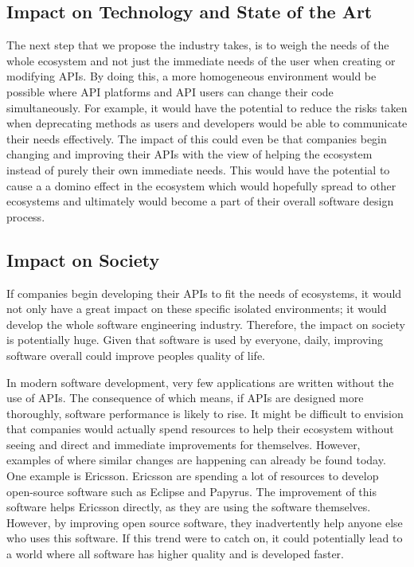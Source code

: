 \documentclass{article}
\begin{document}
\subsection{Impact on Technology and State of the Art}
The next step that we propose the industry takes, is to weigh the needs of the whole ecosystem and not just the immediate needs of the user when creating or modifying APIs. By doing this, a more homogeneous environment would be possible where API platforms and API users can change their code simultaneously. For example, it would have the potential to reduce the risks taken when deprecating methods as users and developers would be able to communicate their needs effectively. The impact of this could even be that companies begin changing and improving their APIs with the view of helping the ecosystem instead of purely their own immediate needs. This would have the potential to cause a a domino effect in the ecosystem which would hopefully spread to other ecosystems and ultimately would become a part of their overall software design process. 

\subsection{Impact on Society}
If companies begin developing their APIs to fit the needs of ecosystems, it would not only have a great impact on these specific isolated environments; it would develop the whole software engineering industry. Therefore, the impact on society is potentially huge. Given that software is used by everyone, daily, improving software overall could improve peoples quality of life.

In modern software development, very few applications are written without the use of APIs. The consequence of which means, if APIs are designed more thoroughly, software performance is likely to rise. It might be difficult to envision that companies would actually spend resources to help their ecosystem without seeing and direct and immediate improvements for themselves. However, examples of where similar changes are happening can already be found today. One example is Ericsson. Ericsson are spending a lot of resources to develop open-source software such as Eclipse and Papyrus. The improvement of this software helps Ericsson directly, as they are using the software themselves. However, by improving open source software, they inadvertently help anyone else who uses this software. If this trend were to catch on, it could potentially lead to a world where all software has higher quality and is developed faster. 
\end{document}

